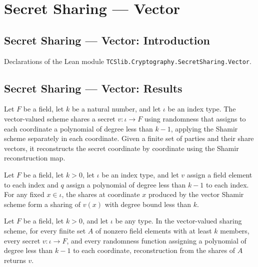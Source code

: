 \section{Secret Sharing --- Vector}
\subsection*{Secret Sharing --- Vector: Introduction}

Declarations of the Lean module \texttt{TCSlib.Cryptography.SecretSharing.Vector}.

\subsection*{Secret Sharing --- Vector: Results}

\begin{definition}
\label{TCSlib.Shamir.vecScheme}
\leanok
{}
Let $F$ be a field, let $k$ be a natural number, and let $\iota$ be an index type. The
vector-valued scheme shares a secret $v\colon\iota\to F$ using randomness that assigns
to each coordinate a polynomial of degree less than $k-1$, applying the Shamir scheme
separately in each coordinate. Given a finite set of parties and their share vectors, it
reconstructs the secret coordinate by coordinate using the Shamir reconstruction map.
\end{definition}

\begin{theorem}
\label{TCSlib.Shamir.isSharing_vecScheme}
\leanok
{}
Let $F$ be a field, let $k>0$, let $\iota$ be an index type, and let $v$ assign a field
element to each index and $q$ assign a polynomial of degree less than $k-1$ to each
index. For any fixed $x\in\iota$, the shares at coordinate $x$ produced by the vector
Shamir scheme form a sharing of $v(x)$ with degree bound less than $k$.
\end{theorem}

\begin{theorem}
\label{TCSlib.Shamir.vecScheme_correct}
\leanok
{}
Let $F$ be a field, let $k>0$, and let $\iota$ be any type. In the vector-valued sharing
scheme, for every finite set $A$ of nonzero field elements with at least $k$ members,
every secret $v:\iota\to F$, and every randomness function assigning a polynomial of
degree less than $k-1$ to each coordinate, reconstruction from the shares of $A$ returns
$v$.
\end{theorem}

